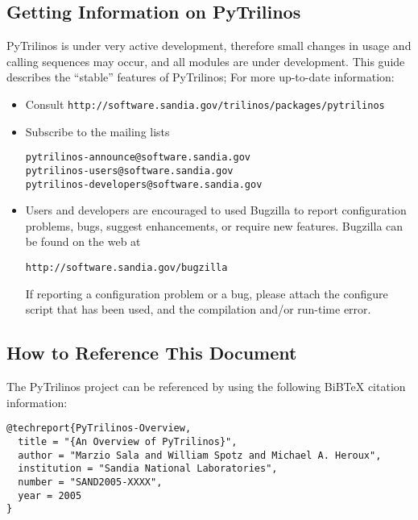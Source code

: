 \documentclass[10pt,relax]{SANDreport}
\newcommand{\PyTrilinos}{{PyTrilinos}}
\begin{document}
\subsection{Getting Information on \PyTrilinos}
\label{sec:getting}

PyTrilinos is under very active development, therefore small changes in usage
and calling sequences may occur, and all modules are under development. This
guide describes the ``stable'' features of PyTrilinos; For more up-to-date
information:
\begin{itemize}
\item Consult \verb!http://software.sandia.gov/trilinos/packages/pytrilinos!
\item Subscribe to the mailing lists
\begin{verbatim}
pytrilinos-announce@software.sandia.gov
pytrilinos-users@software.sandia.gov
pytrilinos-developers@software.sandia.gov
\end{verbatim}
\item Users and developers are encouraged to used Bugzilla to report
configuration problems, bugs, suggest enhancements, or require new features.
Bugzilla can be found on the web at
\begin{verbatim}
http://software.sandia.gov/bugzilla
\end{verbatim}
If reporting a configuration problem or a bug, please attach the configure
script that has been used, and the compilation and/or run-time error.
\end{itemize}

\subsection{How to Reference This Document}
\label{sec:reference}

The PyTrilinos project can be referenced by using the following BiBTeX
citation information: 
\begin{verbatim}
@techreport{PyTrilinos-Overview,
  title = "{An Overview of PyTrilinos}",
  author = "Marzio Sala and William Spotz and Michael A. Heroux",
  institution = "Sandia National Laboratories",
  number = "SAND2005-XXXX",
  year = 2005
}
\end{verbatim}
\end{document}
